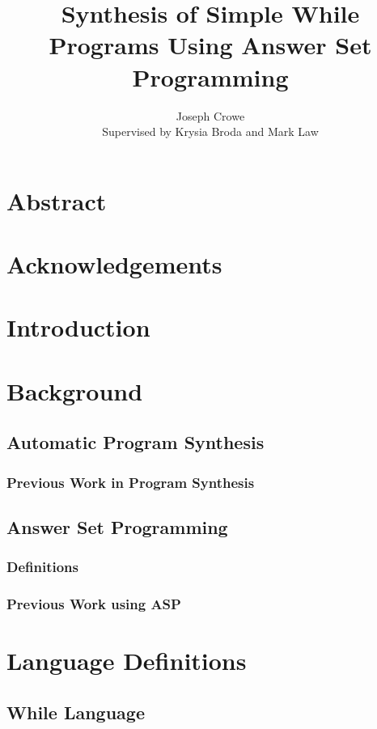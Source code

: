 \documentclass[a4paper,twoside,notitlepage]{article}
\begin{document}
\title{Synthesis of Simple While Programs Using Answer Set Programming}
\author{Joseph Crowe \\ Supervised by Krysia Broda and Mark Law}
\maketitle
\clearpage

\tableofcontents

\section{Abstract}

\section{Acknowledgements}

\section{Introduction}

\section{Background}
\subsection{Automatic Program Synthesis}
\subsubsection{Previous Work in Program Synthesis}
\subsection{Answer Set Programming}
\subsubsection{Definitions}
\subsubsection{Previous Work using ASP}
\clearpage

\section{Language Definitions}
\subsection{While Language}
\end{document}
